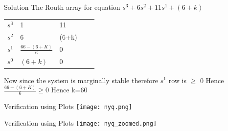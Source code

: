 \begin{enumerate}[label=\thesection.\arabic*.,ref=\thesection.\theenumi]
\begin{frame}{Solution}
The Routh array for equation $s^3+6s^2+11s^1+(6+k)$
\begin{table}[]
\begin{tabular}{lllll}
$s^3$ & 1            & 11    &  &  \\
$s^2$ & 6            & (6+k) &  &  \\
$s^1$ & $\frac{66-(6+K)}{6}$& 0     &  &  \\
$s^0$ & $(6+k)$        & 0     &  & 


\end{tabular}
\end{table}
Now since the system is marginally stable therefore $s^1$ row is $\geq$ 0\newline
Hence $\frac{66-(6+K)}{6}$$\geq$0
Hence k=60
\end{frame}
\begin{frame}{Verification using Plots}
\texttt{[image: nyq.png]}

\end{frame}
\begin{frame}{Verification using Plots}
\texttt{[image: nyq\_zoomed.png]}

\end{frame}

\end{enumerate}

